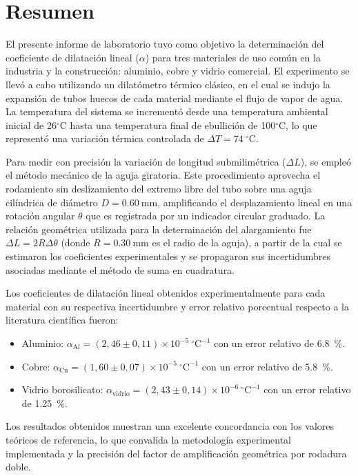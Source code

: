 
\section{Resumen}

El presente informe de laboratorio tuvo como objetivo la determinación del coeficiente de dilatación lineal ($\alpha$) para tres materiales de uso común en la industria y la construcción: aluminio, cobre y vidrio comercial. El experimento se llevó a cabo utilizando un dilatómetro térmico clásico, en el cual se indujo la expansión de tubos huecos de cada material mediante el flujo de vapor de agua. La temperatura del sistema se incrementó desde una temperatura ambiental inicial de 26$^\circ$C hasta una temperatura final de ebullición de 100$^\circ$C, lo que representó una variación térmica controlada de $\Delta T = 74\ ^\circ\text{C}$.

Para medir con precisión la variación de longitud submilimétrica ($\Delta L$), se empleó el método mecánico de la aguja giratoria. Este procedimiento aprovecha el rodamiento sin deslizamiento del extremo libre del tubo sobre una aguja cilíndrica de diámetro $D = \qty{0,60}{\milli\meter}$, amplificando el desplazamiento lineal en una rotación angular $\theta$ que es registrada por un indicador circular graduado. La relación geométrica utilizada para la determinación del alargamiento fue $\Delta L = 2R\Delta\theta$ (donde $R = \qty{0,30}{\milli\meter}$ es el radio de la aguja), a partir de la cual se estimaron los coeficientes experimentales y se propagaron sus incertidumbres asociadas mediante el método de suma en cuadratura.

Los coeficientes de dilatación lineal obtenidos experimentalmente para cada material con su respectiva incertidumbre y error relativo porcentual respecto a la literatura científica fueron:
\begin{itemize}
    \item Aluminio: $\alpha_{\text{Al}} = (2{,}46 \pm 0{,}11) \times 10^{-5}\ ^\circ\text{C}^{-1}$ con un error relativo de \qty{6.8}{\percent}.
    \item Cobre: $\alpha_{\text{Cu}} = (1{,}60 \pm 0{,}07) \times 10^{-5}\ ^\circ\text{C}^{-1}$ con un error relativo de \qty{5.8}{\percent}.
    \item Vidrio borosilicato: $\alpha_{\text{vidrio}} = (2{,}43 \pm 0{,}14) \times 10^{-6}\ ^\circ\text{C}^{-1}$ con un error relativo de \qty{1.25}{\percent}.
\end{itemize}
Los resultados obtenidos muestran una excelente concordancia con los valores teóricos de referencia, lo que convalida la metodología experimental implementada y la precisión del factor de amplificación geométrica por rodadura doble.